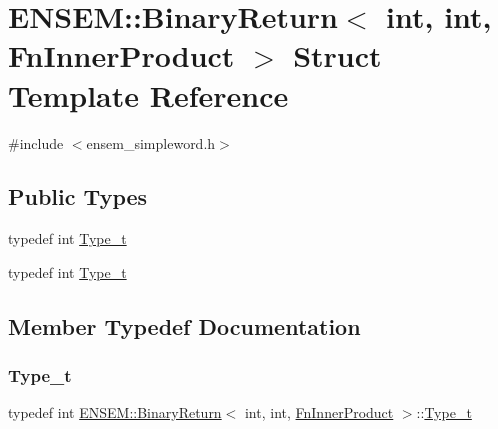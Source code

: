 \hypertarget{structENSEM_1_1BinaryReturn_3_01int_00_01int_00_01FnInnerProduct_01_4}{}\section{E\+N\+S\+EM\+:\+:Binary\+Return$<$ int, int, Fn\+Inner\+Product $>$ Struct Template Reference}
\label{structENSEM_1_1BinaryReturn_3_01int_00_01int_00_01FnInnerProduct_01_4}


{\ttfamily \#include $<$ensem\+\_\+simpleword.\+h$>$}

\subsection*{Public Types}
\begin{DoxyCompactItemize}
\item 
typedef int \mbox{\hyperlink{structENSEM_1_1BinaryReturn_3_01int_00_01int_00_01FnInnerProduct_01_4_a702d8c8623acf6a0b21fd2fc27b4fa44}{Type\+\_\+t}}
\item 
typedef int \mbox{\hyperlink{structENSEM_1_1BinaryReturn_3_01int_00_01int_00_01FnInnerProduct_01_4_a702d8c8623acf6a0b21fd2fc27b4fa44}{Type\+\_\+t}}
\end{DoxyCompactItemize}


\subsection{Member Typedef Documentation}
\mbox{\label{structENSEM_1_1BinaryReturn_3_01int_00_01int_00_01FnInnerProduct_01_4_a702d8c8623acf6a0b21fd2fc27b4fa44}} 
\subsubsection{\texorpdfstring{Type\_t}{Type\_t}\hspace{0.1cm}{\footnotesize\ttfamily [1/2]}}
{\footnotesize\ttfamily typedef int \mbox{\hyperlink{structENSEM_1_1BinaryReturn}{E\+N\+S\+E\+M\+::\+Binary\+Return}}$<$ int, int, \mbox{\hyperlink{structENSEM_1_1FnInnerProduct}{Fn\+Inner\+Product}} $>$\+::\mbox{\hyperlink{structENSEM_1_1BinaryReturn_3_01int_00_01int_00_01FnInnerProduct_01_4_a702d8c8623acf6a0b21fd2fc27b4fa44}{Type\+\_\+t}}}

